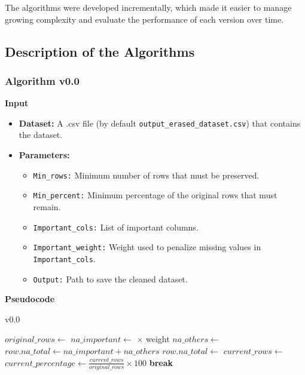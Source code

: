 \documentclass[a4paper,12pt]{article}
\begin{document}
The algorithms were developed incrementally, which made it easier to manage growing complexity and evaluate the performance of each version over time.


\subsection{Description of the Algorithms}
\subsubsection{Algorithm v0.0}
\textbf{Input}
\begin{itemize}
    \item \textbf{Dataset:} A .csv file (by default \texttt{output\_erased\_dataset.csv}) that contains the dataset.
    \item \textbf{Parameters:}
    \begin{itemize}
        \item \texttt{Min\_rows:} Minimum number of rows that must be preserved.
        \item \texttt{Min\_percent:} Minimum percentage of the original rows that must remain.
        \item \texttt{Important\_cols:} List of important columns.
        \item \texttt{Important\_weight:} Weight used to penalize missing values in \texttt{Important\_cols}.
        \item \texttt{Output:} Path to save the cleaned dataset.
    \end{itemize}
\end{itemize}


\textbf{Pseudocode}
\begin{algorithm}[H]
\caption{v0.0}
\begin{algorithmic}[1]
    \State $original\_rows \gets$ 
            \State $na\_important \gets$  $\times$ weight
            \State $na\_others \gets$ 
            \State $row.na\_total \gets na\_important + na\_others$
        \Else
            \State $row.na\_total \gets$ 
        \EndIf
    \EndFor
    \State {}
        \State $current\_rows \gets$ 
        \State $current\_percentage \gets \frac{current\_rows}{original\_rows} \times 100$
            \State \textbf{break}
        \EndIf
        \State {}
    \EndWhile
    \State {}
\EndFunction
\end{algorithmic}
\end{algorithm}
\end{document}
